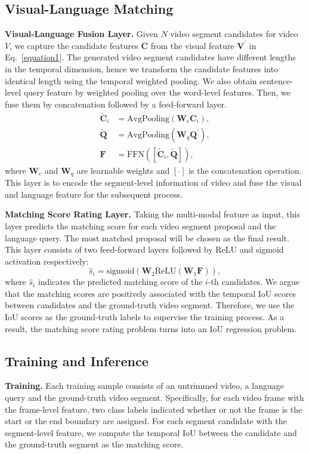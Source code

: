 \documentclass[letterpaper]{article} %
\begin{document}
\subsection{Visual-Language Matching}\label{VLM}
\textbf{Visual-Language Fusion Layer.}
Given $N$ video segment candidates for video $V$, we capture the candidate features
$\bm{C}$ from the visual feature $\bm{V}^{'}$ in Eq.~\eqref{equation1}.
The generated video segment candidates have different lengths in the temporal dimension,  
hence we transform the candidate features into identical length using the temporal weighted pooling. 
We also obtain sentence-level query feature by weighted pooling over the word-level features. 
Then, we fuse them by concatenation followed by a feed-forward layer.
\begin{equation}
\begin{split}
\bm{\widetilde{C}}_{i}&= \text{AvgPooling}(\bm{W}_{c}\bm{C}_{i}), \\
\bm{\widetilde{Q}}&= \text{AvgPooling}(\bm{W}_{q}\bm{Q}^{'}), \\
\bm{F}&= \text{FFN}([\bm{\widetilde{C}}_{i},\bm{\widetilde{Q}}]),
\end{split}
\label{equation7}
\end{equation}
where $\bm{W}_{c}$ and $\bm{W}_{q}$ are learnable weights and 
$[\cdot]$ is the concatenation operation.
This layer is to encode the segment-level information of video and fuse  
the visual and language feature for the subsequent process.

\noindent\textbf{Matching Score Rating Layer.}
Taking the multi-modal feature as input, this layer predicts the matching score for each video segment proposal and the language query. 
The most matched proposal will be chosen as the final result. 
This layer consists of two feed-forward layers followed by ReLU and sigmoid activation respectively: 
\begin{equation}
\hat{s}_{i} = \text{sigmoid}(\bm{W}_{2} \text{ReLU} (\bm{W}_{1}\bm{F})),
\label{equation8}
\end{equation}
where $\hat{s}_{i}$ indicates the predicted matching score of the $i$-th candidates. 
We argue that the matching scores are positively associated with the temporal
IoU scores between candidates and the ground-truth video segment. 
Therefore, we use the IoU scores as the ground-truth labels to supervise the training process. 
As a result, 
the matching score rating problem turns into an IoU regression problem. 

\subsection{Training and Inference}\label{training}
\textbf{Training.} Each training sample consists of an untrimmed video, a language query and the ground-truth 
video segment. 
Specifically, for each video frame with the frame-level feature, two class labels indicated whether or not the 
frame is the start or the end boundary are assigned.
For each segment candidate with the segment-level feature, we compute the temporal IoU between the 
candidate and the ground-truth segment as the matching score.
\end{document}
